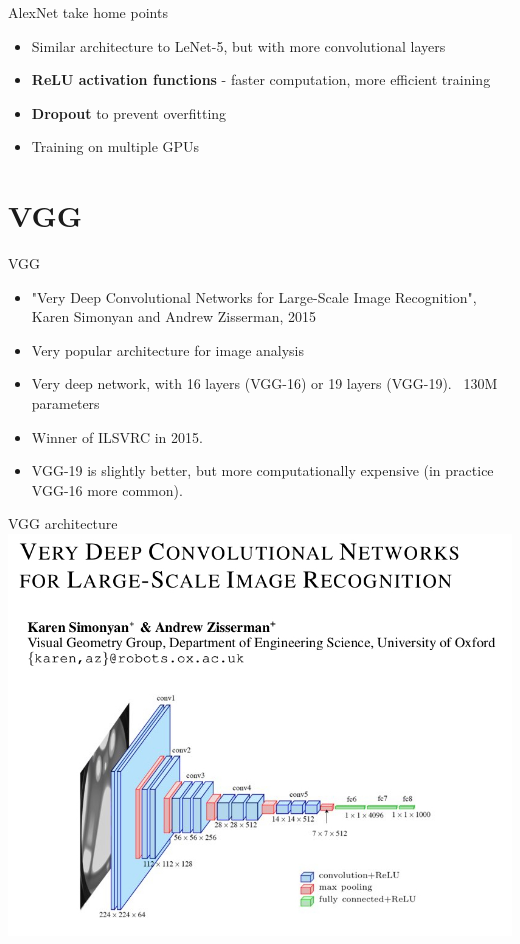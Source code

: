 \documentclass[9pt, aspectratio=169]{beamer}
\begin{document}
\begin{frame}
    {AlexNet take home points}
    \begin{itemize}
        \item Similar architecture to LeNet-5, but with more convolutional layers
        \item \textbf{ReLU activation functions} - faster computation, more efficient training
        \item \textbf{Dropout} to prevent overfitting
        \item Training on multiple GPUs
    \end{itemize}
\end{frame}

\section{VGG}

\begin{frame}
    {VGG}
    \begin{itemize}
        \item "Very Deep Convolutional Networks for Large-Scale Image Recognition", Karen Simonyan and Andrew Zisserman, 2015
        \item Very popular architecture for image analysis
        \item Very deep network, with 16 layers (VGG-16) or 19 layers (VGG-19). ~130M parameters
        \item Winner of ILSVRC in 2015.
        \item VGG-19 is slightly better, but more computationally expensive (in practice VGG-16 more common).
    \end{itemize}
\end{frame}

\begin{frame}
    {VGG architecture}
    \centering
    \includegraphics[width=.7\textwidth]{VGG16.jpg}
\end{frame}
\end{document}
